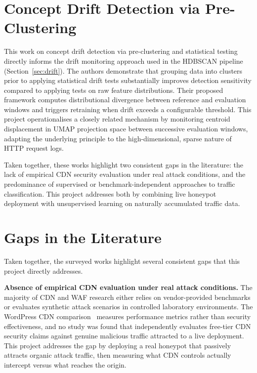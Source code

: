 \documentclass[12pt, a4paper]{report}   %
\begin{document}
\section{Concept Drift Detection via Pre-Clustering~\cite{concept-drift}}
This work on concept drift detection via pre-clustering and statistical testing
directly informs the drift monitoring approach used in the HDBSCAN pipeline
(Section~\ref{sec:drift}). The authors demonstrate that grouping data into clusters
prior to applying statistical drift tests substantially improves detection sensitivity
compared to applying tests on raw feature distributions. Their proposed framework
computes distributional divergence between reference and evaluation windows and
triggers retraining when drift exceeds a configurable threshold. This project
operationalises a closely related mechanism by monitoring centroid displacement
in UMAP projection space between successive evaluation windows, adapting the
underlying principle to the high-dimensional, sparse nature of HTTP request logs.

\medskip
Taken together, these works highlight two consistent gaps in the literature: the lack
of empirical CDN security evaluation under real attack conditions, and the predominance
of supervised or benchmark-independent approaches to traffic classification. This
project addresses both by combining live honeypot deployment with unsupervised
learning on naturally accumulated traffic data.

\section{Gaps in the Literature}
\label{sec:gaps}

Taken together, the surveyed works highlight several consistent gaps that this
project directly addresses.

\textbf{Absence of empirical CDN evaluation under real attack conditions.}
The majority of CDN and WAF research either relies on vendor-provided benchmarks or
evaluates synthetic attack scenarios in controlled laboratory environments. The
WordPress CDN comparison~\cite{cloudflare-wp} measures performance metrics rather
than security effectiveness, and no study was found that independently evaluates
free-tier CDN security claims against genuine malicious traffic attracted to a live
deployment. This project addresses the gap by deploying a real honeypot that passively
attracts organic attack traffic, then measuring what CDN controls actually intercept
versus what reaches the origin.
\end{document}
